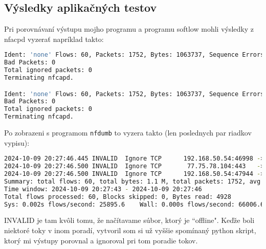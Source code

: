 \documentclass[a4paper, 12pt]{article}
\begin{document}
\subsection{Výsledky aplikačných testov}
Pri porovnávaní výstupu mojho programu a programu softlow mohli výsledky z nfacpd vyzerať napríklad takto:
\begin{lstlisting}[language=bash,basicstyle=\footnotesize]
Ident: 'none' Flows: 60, Packets: 1752, Bytes: 1063737, Sequence Errors: 0, 
Bad Packets: 0
Total ignored packets: 0
Terminating nfcapd.

Ident: 'none' Flows: 60, Packets: 1752, Bytes: 1063737, Sequence Errors: 0, 
Bad Packets: 0
Total ignored packets: 0
Terminating nfcapd.
\end{lstlisting}
Po zobrazeni s programom \texttt{nfdumb} to vyzera takto (len poslednych par riadkov vypisu):
\begin{lstlisting}[language=bash,basicstyle=\tiny]
2024-10-09 20:27:46.445 INVALID  Ignore TCP      192.168.50.54:46998 ->     77.75.76.209:443            0.0.0.0:0     ->          0.0.0.0:0         3048        0
2024-10-09 20:27:46.500 INVALID  Ignore TCP       77.75.78.104:443   ->    192.168.50.54:47944          0.0.0.0:0     ->          0.0.0.0:0        22482        0
2024-10-09 20:27:46.500 INVALID  Ignore TCP      192.168.50.54:47944 ->     77.75.78.104:443            0.0.0.0:0     ->          0.0.0.0:0         1932        0
Summary: total flows: 60, total bytes: 1.1 M, total packets: 1752, avg bps: 2.4 M, avg pps: 503, avg bpp: 607
Time window: 2024-10-09 20:27:43 - 2024-10-09 20:27:46
Total flows processed: 60, Blocks skipped: 0, Bytes read: 4928
Sys: 0.002s flows/second: 25895.6    Wall: 0.000s flows/second: 66006.6
\end{lstlisting}
INVALID je tam kvôli tomu, že načítavame súbor, ktorý je ``offline". Keďže boli niektoré toky v inom poradí, vytvoril som si už vyššie spomínaný python skript, ktorý mi výstupy porovnal a ignoroval pri tom poradie tokov.
\end{document}
